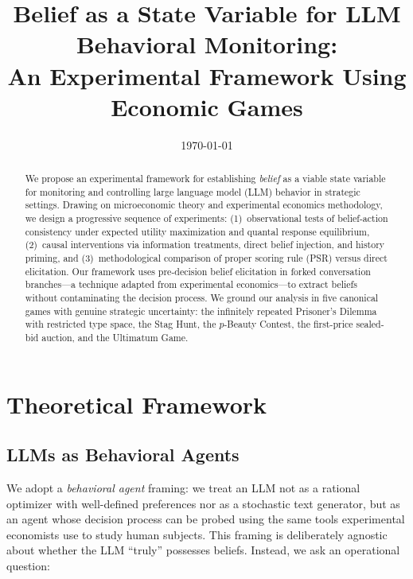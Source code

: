 \documentclass[12pt]{article}
\title{Belief as a State Variable for LLM Behavioral Monitoring:\\
An Experimental Framework Using Economic Games}
\author{}
\date{\today}
\begin{document}
\maketitle

\begin{abstract}
We propose an experimental framework for establishing \emph{belief} as a viable state variable for monitoring and controlling large language model (LLM) behavior in strategic settings. Drawing on microeconomic theory and experimental economics methodology, we design a progressive sequence of experiments: (1)~observational tests of belief-action consistency under expected utility maximization and quantal response equilibrium, (2)~causal interventions via information treatments, direct belief injection, and history priming, and (3)~methodological comparison of proper scoring rule (PSR) versus direct elicitation. Our framework uses pre-decision belief elicitation in forked conversation branches---a technique adapted from experimental economics---to extract beliefs without contaminating the decision process. We ground our analysis in five canonical games with genuine strategic uncertainty: the infinitely repeated Prisoner's Dilemma with restricted type space, the Stag Hunt, the $p$-Beauty Contest, the first-price sealed-bid auction, and the Ultimatum Game.
\end{abstract}

\tableofcontents
\newpage

\section{Theoretical Framework}
\label{sec:theory}

\subsection{LLMs as Behavioral Agents}
\label{sec:behavioral_agents}

We adopt a \emph{behavioral agent} framing: we treat an LLM not as a rational optimizer with well-defined preferences nor as a stochastic text generator, but as an agent whose decision process can be probed using the same tools experimental economists use to study human subjects. This framing is deliberately agnostic about whether the LLM ``truly'' possesses beliefs. Instead, we ask an operational question:
\end{document}
